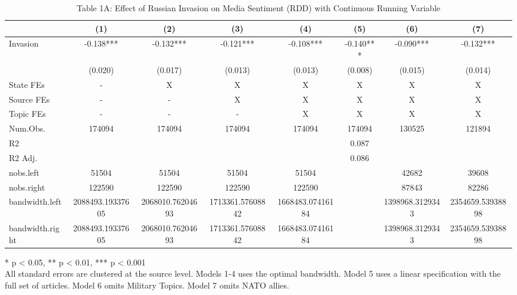 \begin{table}[!t]
\caption{Table 1A: Effect of Russian Invasion on Media Sentiment (RDD) with Continuous Running Variable} 
\fontsize{12.0pt}{14.4pt}\selectfont
\begin{tabular*}{\linewidth}{@{\extracolsep{\fill}}lccccccc}
\toprule
  & (1) & (2) & (3) & (4) & (5) & (6) & (7) \\ 
\midrule\addlinespace[2.5pt]
Invasion & -0.138*** & -0.132*** & -0.121*** & -0.108*** & -0.140*** & -0.090*** & -0.132*** \\ 
{} & {(0.020)} & {(0.017)} & {(0.013)} & {(0.013)} & {(0.008)} & {(0.015)} & {(0.014)} \\ 
State FEs & - & X & X & X & X & X & X \\ 
Source FEs & - & - & X & X & X & X & X \\ 
Topic FEs & - & - & - & X & X & X & X \\ 
Num.Obs. & 174094 & 174094 & 174094 & 174094 & 174094 & 130525 & 121894 \\ 
R2 &  &  &  &  & 0.087 &  &  \\ 
R2 Adj. &  &  &  &  & 0.086 &  &  \\ 
nobs.left & 51504 & 51504 & 51504 & 51504 &  & 42682 & 39608 \\ 
nobs.right & 122590 & 122590 & 122590 & 122590 &  & 87843 & 82286 \\ 
bandwidth.left & 2088493.19337605 & 2068010.76204693 & 1713361.57608842 & 1668483.07416184 &  & 1398968.3129343 & 2354659.53938898 \\ 
bandwidth.right & 2088493.19337605 & 2068010.76204693 & 1713361.57608842 & 1668483.07416184 &  & 1398968.3129343 & 2354659.53938898 \\ 
\bottomrule
\end{tabular*}
\begin{minipage}{\linewidth}
* p < 0.05, ** p < 0.01, *** p < 0.001\\
All standard errors are clustered at the source level. Models 1-4 uses the
optimal bandwidth. Model 5 uses a linear specification with the full set of
articles. Model 6 omits Military Topics. Model 7 omits NATO allies.\\
\end{minipage}
\end{table}

